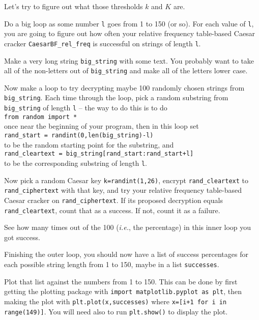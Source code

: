 \documentclass[12pt,letterpaper]{amsbook}
\theoremstyle{definition}
\theoremstyle{remark}
\numberwithin{figure}{section}
\numberwithin{exercise}{chapter}
\numberwithin{section}{chapter}
\numberwithin{equation}{section}
\numberwithin{table}{subsection}
\newcommand{\code}[1]{\colorbox{lg}{\texttt{#1}}}
\begin{document}
\vskip1mm
\begin{BTtcb}[label=bt:crack_Caesar_diff_sizes]{}{}
 Let's try to figure out what those thresholds $k$ and $K$ are.

 Do a big loop as some number \code{l} goes from 1 to 150 (or so).  For
 each value of \code{l}, you are going to figure out how often your
 relative frequency table-based Caesar cracker \code{CaesarBF\_rel\_freq}
 is successful on strings of length \code{l}.

 Make a very long string \code{big\_string} with some text. You probably
 want to take all of the non-letters out of \code{big\_string} and make
 all of the letters lower case.

 Now make a loop to try decrypting maybe 100 randomly chosen strings from
 \code{big\_string}.  Each time through the loop, pick a random substring
 from \code{big\_string} of length \code{l} -- the way to do this
 is to do\\
 \hphantom{XXX}\code{from random import *}\\
 once near the beginning of your program, then in this loop set\\
 \hphantom{XXX}\code{rand\_start = randint(0,len(big\_string)-l)}\\
 to be the random starting point for the substring, and\\
 \hphantom{XXX}\code{rand\_cleartext = big\_string[rand\_start:rand\_start+l]}\\
 to be the corresponding substring of length \code{l}.

 Now pick a random Caesar key \code{k=randint(1,26)}, encrypt
 \code{rand\_cleartext} to \code{rand\_ciphertext} with that key, and
 try your relative frequency table-based Caesar cracker on
 \code{rand\_ciphertext}.  If its proposed decryption equals
 \code{rand\_cleartext}, count that as a success.  If not, count it as a
 failure.

 See how many times out of the 100 (\textit{i.e.}, the percentage) in this
 inner loop you got success.
 
 Finishing the outer loop, you should now have a list of success percentages
 for each possible string length from 1 to 150, maybe in a list
 \code{successes}.

 Plot that list against the numbers from 1 to 150.  This can be done by first
 getting the plotting package with \code{import matplotlib.pyplot as plt},
 then making the plot with \code{plt.plot(x,successes)} where
 \code{x=[i+1 for i in range(149)]}.  You will need also to run
 \code{plt.show()} to display the plot.
\end{BTtcb}
\end{document}
